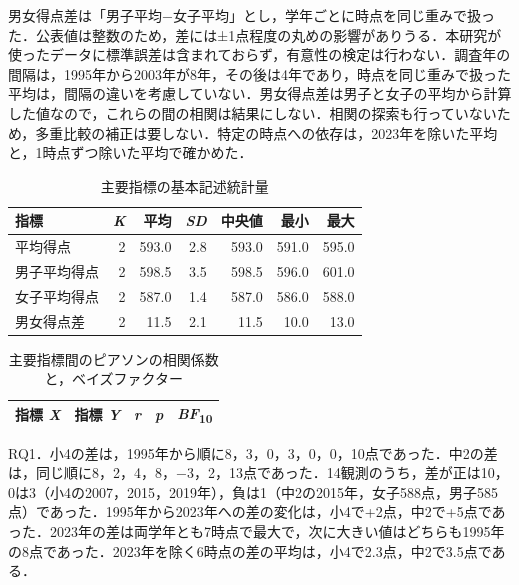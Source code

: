 \documentclass[a4paper,10pt,twocolumn]{ltjsarticle}
\makeatletter
\renewcommand{\section}{\@startsection{section}{1}{\z@}{1.1\Cvs \@plus.4\Cdp \@minus.2\Cdp}{.5\Cvs \@plus.2\Cdp}{\normalfont\gtfamily\bfseries\large}}
\makeatother
\begin{document}
男女得点差は「男子平均−女子平均」とし，学年ごとに時点を同じ重みで扱った．公表値は整数のため，差には±1点程度の丸めの影響がありうる．本研究が使ったデータに標準誤差は含まれておらず，有意性の検定は行わない．調査年の間隔は，1995年から2003年が8年，その後は4年であり，時点を同じ重みで扱った平均は，間隔の違いを考慮していない．男女得点差は男子と女子の平均から計算した値なので，これらの間の相関は結果にしない．相関の探索も行っていないため，多重比較の補正は要しない．特定の時点への依存は，2023年を除いた平均と，1時点ずつ除いた平均で確かめた．
\begin{table}[!t]
\caption{主要指標の基本記述統計量}
\centering\small
\begin{tabular}{>{\raggedright\arraybackslash}p{9.2cm}rrrrrr}
\toprule
指標 & \textit{K} & 平均 & \textit{SD} & 中央値 & 最小 & 最大 \\
\midrule
平均得点 & 2 & 593.0 & 2.8 & 593.0 & 591.0 & 595.0 \\
男子平均得点 & 2 & 598.5 & 3.5 & 598.5 & 596.0 & 601.0 \\
女子平均得点 & 2 & 587.0 & 1.4 & 587.0 & 586.0 & 588.0 \\
男女得点差 & 2 & 11.5 & 2.1 & 11.5 & 10.0 & 13.0 \\
\bottomrule
\end{tabular}
\par{}
\end{table}
\begin{table}[!t]
\caption{主要指標間のピアソンの相関係数と，ベイズファクター}
\centering\small
\begin{tabular}{>{\raggedright\arraybackslash}p{6.4cm}>{\raggedright\arraybackslash}p{6.4cm}rrr}
\toprule
指標 \textit{X} & 指標 \textit{Y} & \textit{r} & \textit{p} & \textit{BF}\textsubscript{10} \\
\midrule

\bottomrule
\end{tabular}
\par{}
\end{table}
\section{結果}
RQ1．小4の差は，1995年から順に8，3，0，3，0，0，10点であった．中2の差は，同じ順に8，2，4，8，−3，2，13点であった．14観測のうち，差が正は10，0は3（小4の2007，2015，2019年），負は1（中2の2015年，女子588点，男子585点）であった．1995年から2023年への差の変化は，小4で+2点，中2で+5点であった．2023年の差は両学年とも7時点で最大で，次に大きい値はどちらも1995年の8点であった．2023年を除く6時点の差の平均は，小4で2.3点，中2で3.5点である．
\end{document}
